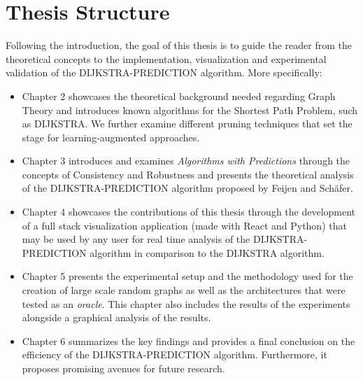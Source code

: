\section{Thesis Structure}
Following the introduction, the goal of this thesis is to guide the reader from the theoretical concepts to the implementation, visualization and experimental validation of the DIJKSTRA-PREDICTION algorithm. More specifically:
\begin{itemize}
    \item Chapter 2 showcases the theoretical background needed regarding Graph Theory and introduces known algorithms for the Shortest Path Problem, such as \textsc{DIJKSTRA}. We further examine different pruning techniques that set the stage for learning-augmented approaches.
    
    \item Chapter 3 introduces and examines \textit{Algorithms with Predictions} through the concepts of Consistency and Robustness and presents the theoretical analysis of the \textsc{DIJKSTRA-PREDICTION} algorithm proposed by Feijen and Schäfer\cite{feijenDijkstrasAlgorithmPredictions2023}.
    
    \item Chapter 4 showcases the contributions of this thesis through the development of a full stack visualization application (made with React and Python) that may be used by any user for real time analysis of the \textsc{DIJKSTRA-PREDICTION} algorithm in comparison to the \textsc{DIJKSTRA} algorithm.
    
    \item Chapter 5 presents the experimental setup and the methodology used for the creation of large scale random graphs as well as the architectures that were tested as an \textit{oracle}. This chapter also includes the results of the experiments alongside a graphical analysis of the results.
    
    \item Chapter 6 summarizes the key findings and provides a final conclusion on the efficiency of the \textsc{DIJKSTRA-PREDICTION} algorithm. Furthermore, it proposes promising avenues for future research.
\end{itemize}